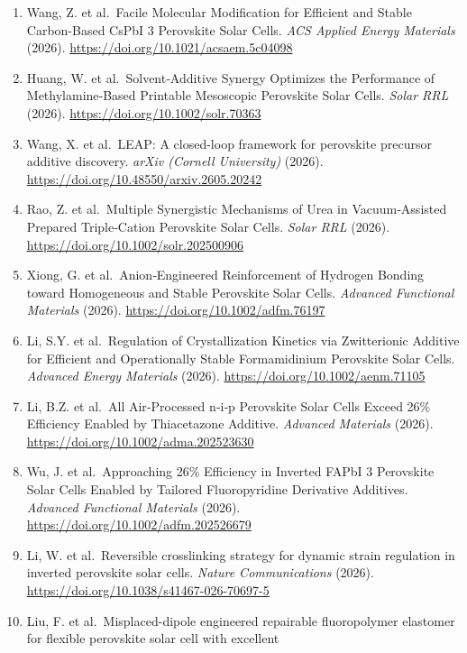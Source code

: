 \documentclass[
  11pt,
]{article}
\begin{document}
\begin{enumerate}
  Stable CsPbI 3 Perovskite Solar Cells. \emph{The Journal of Physical
  Chemistry Letters} (2026).
  \url{https://doi.org/10.1021/acs.jpclett.6c01395}
\item
  Wang, Z. et al.~Facile Molecular Modification for Efficient and Stable
  Carbon-Based CsPbI 3 Perovskite Solar Cells. \emph{ACS Applied Energy
  Materials} (2026). \url{https://doi.org/10.1021/acsaem.5c04098}
\item
  Huang, W. et al.~Solvent‐Additive Synergy Optimizes the Performance of
  Methylamine‐Based Printable Mesoscopic Perovskite Solar Cells.
  \emph{Solar RRL} (2026). \url{https://doi.org/10.1002/solr.70363}
\item
  Wang, X. et al.~LEAP: A closed-loop framework for perovskite precursor
  additive discovery. \emph{arXiv (Cornell University)} (2026).
  \url{https://doi.org/10.48550/arxiv.2605.20242}
\item
  Rao, Z. et al.~Multiple Synergistic Mechanisms of Urea in
  Vacuum‐Assisted Prepared Triple‐Cation Perovskite Solar Cells.
  \emph{Solar RRL} (2026). \url{https://doi.org/10.1002/solr.202500906}
\item
  Xiong, G. et al.~Anion‐Engineered Reinforcement of Hydrogen Bonding
  toward Homogeneous and Stable Perovskite Solar Cells. \emph{Advanced
  Functional Materials} (2026). \url{https://doi.org/10.1002/adfm.76197}
\item
  Li, S.Y. et al.~Regulation of Crystallization Kinetics via
  Zwitterionic Additive for Efficient and Operationally Stable
  Formamidinium Perovskite Solar Cells. \emph{Advanced Energy Materials}
  (2026). \url{https://doi.org/10.1002/aenm.71105}
\item
  Li, B.Z. et al.~All Air‐Processed n‐i‐p Perovskite Solar Cells Exceed
  26\% Efficiency Enabled by Thiacetazone Additive. \emph{Advanced
  Materials} (2026). \url{https://doi.org/10.1002/adma.202523630}
\item
  Wu, J. et al.~Approaching 26\% Efficiency in Inverted FAPbI 3
  Perovskite Solar Cells Enabled by Tailored Fluoropyridine Derivative
  Additives. \emph{Advanced Functional Materials} (2026).
  \url{https://doi.org/10.1002/adfm.202526679}
\item
  Li, W. et al.~Reversible crosslinking strategy for dynamic strain
  regulation in inverted perovskite solar cells. \emph{Nature
  Communications} (2026).
  \url{https://doi.org/10.1038/s41467-026-70697-5}
\item
  Liu, F. et al.~Misplaced-dipole engineered repairable fluoropolymer
  elastomer for flexible perovskite solar cell with excellent

\end{enumerate}
\end{document}
